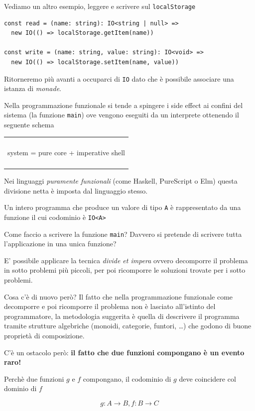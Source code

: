 \documentclass[12pt]{article}
\newenvironment{boxed}
    {\begin{center}
    \begin{tabular}{|p{0.9\textwidth}|}
    \hline\\
    }
    {
    \\\\\hline
    \end{tabular}
    \end{center}
    }
\begin{document}
Vediamo un altro esempio, leggere e scrivere sul \texttt{localStorage}

\begin{verbatim}
const read = (name: string): IO<string | null> =>
  new IO(() => localStorage.getItem(name))

const write = (name: string, value: string): IO<void> =>
  new IO(() => localStorage.setItem(name, value))
\end{verbatim}

Ritorneremo più avanti a occuparci di \texttt{IO} dato che è possibile associare una istanza di \emph{monade}.

Nella programmazione funzionale si tende a spingere i side effect ai confini del sistema (la funzione \texttt{main})
ove vengono eseguiti da un interprete ottenendo il seguente schema

\begin{boxed}
\begin{center}
system = pure core + imperative shell
\end{center}
\end{boxed}

Nei linguaggi \emph{puramente funzionali} (come Haskell, PureScript o Elm) questa divisione netta è imposta dal linguaggio stesso.

Un intero programma che produce un valore di tipo \texttt{A} è rappresentato da una funzione il cui codominio è \texttt{IO<A>}

Come faccio a scrivere la funzione \texttt{main}? Davvero si pretende di scrivere tutta l'applicazione in una unica funzione?

E' possibile applicare la tecnica \emph{divide et impera} ovvero decomporre il problema in sotto problemi più piccoli,
per poi ricomporre le soluzioni trovate per i sotto problemi.

Cosa c'è di nuovo però? Il fatto che nella programmazione funzionale come decomporre e poi ricomporre il problema non è lasciato
all'istinto del programmatore, la metodologia suggerita è quella di descrivere il programma tramite strutture algebriche
(monoidi, categorie, funtori, \ldots) che godono di buone proprietà di composizione.

C'è un ostacolo però: \textbf{il fatto che due funzioni compongano è un evento raro!}

Perchè due funzioni $g$ e $f$ compongano, il codominio di $g$ deve coincidere col dominio di $f$

$$
g: A \rightarrow B, f: B \rightarrow C
$$
\end{document}
